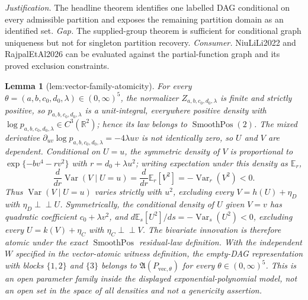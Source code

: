 \documentclass{article}
\newtheorem{lemma}{Lemma}
\begin{document}
\par\smallskip\noindent \textit{Justification.} The headline theorem identifies one labelled DAG conditional on every admissible partition and exposes the remaining partition domain as an identified set. \textit{Gap.} The supplied-group theorem is sufficient for conditional graph uniqueness but not for singleton partition recovery. \textit{Consumer.} NiuLiLi2022 and RajpalEtAl2026 can be evaluated against the partial-function graph and its proved exclusion constraints.

\begin{lemma}[lem:vector-family-atomicity]\label{lem:vector-family-atomicity}
For every \(\theta=(a,b,c_0,d_0,\lambda)\in(0,\infty)^5\), the normalizer \(Z_{a,b,c_0,d_0,\lambda}\) is finite and strictly positive, so \(p_{a,b,c_0,d_0,\lambda}\) is a unit-integral, everywhere positive density with \(\log p_{a,b,c_0,d_0,\lambda}\in C^3(\mathbb R^2)\); hence its law belongs to \(\operatorname{SmoothPos}(2)\). The mixed derivative \(\partial_{uv}\log p_{a,b,c_0,d_0,\lambda}=-4\lambda uv\) is not identically zero, so \(U\) and \(V\) are dependent. Conditional on \(U=u\), the symmetric density of \(V\) is proportional to \(\exp\{-b v^4-rv^2\}\) with \(r=d_0+\lambda u^2\); writing expectation under this density as \(\mathbb E_r\), \[\frac{d}{dr}\operatorname{Var}(V\mid U=u)=\frac{d}{dr}\mathbb E_r[V^2]=-\operatorname{Var}_r(V^2)<0.\] Thus \(\operatorname{Var}(V\mid U=u)\) varies strictly with \(u^2\), excluding every \(V=h(U)+\eta_D\) with \(\eta_D\perp\!\!\!\perp U\). Symmetrically, the conditional density of \(U\) given \(V=v\) has quadratic coefficient \(c_0+\lambda v^2\), and \(d\mathbb E_s[U^2]/ds=-\operatorname{Var}_s(U^2)<0\), excluding every \(U=k(V)+\eta_C\) with \(\eta_C\perp\!\!\!\perp V\). The bivariate innovation is therefore atomic under the exact \(\operatorname{SmoothPos}\) residual-law definition. With the independent \(W\) specified in the vector-atomic witness definition, the empty-DAG representation with blocks \(\{1,2\}\) and \(\{3\}\) belongs to \(\mathfrak A(P_{\mathrm{vec},\theta})\) for every \(\theta\in(0,\infty)^5\). This is an open parameter family inside the displayed exponential-polynomial model, not an open set in the space of all densities and not a genericity assertion.
\end{lemma}
\end{document}
